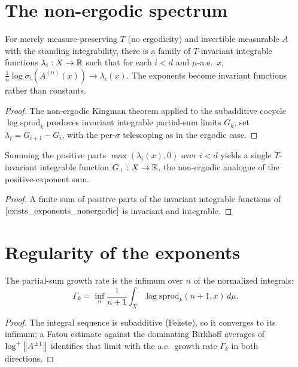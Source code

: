 \section{The non-ergodic spectrum}

\begin{theorem}\label{exists_exponents_nonergodic}
  \leanok
  For merely measure-preserving $T$ (no ergodicity) and invertible measurable $A$ with the standing integrability, there is a family of $T$-invariant integrable functions $\lambda_i : X \to \mathbb{R}$ such that for each $i < d$ and $\mu$-a.e.\ $x$, $\tfrac1n\log\sigma_i(A^{(n)}(x)) \to \lambda_i(x)$. The exponents become invariant functions rather than constants.
\end{theorem}
\begin{proof}\leanok
  The non-ergodic Kingman theorem applied to the subadditive cocycle $\log\mathrm{sprod}_k$ produces invariant integrable partial-sum limits $G_k$; set $\lambda_i = G_{i+1} - G_i$, with the per-$\sigma$ telescoping as in the ergodic case.
\end{proof}

\begin{corollary}\label{exists_sumPosExp_nonergodic}
  \leanok
  Summing the positive parts $\max(\lambda_i(x),0)$ over $i < d$ yields a single $T$-invariant integrable function $G_+ : X \to \mathbb{R}$, the non-ergodic analogue of the positive-exponent sum.
\end{corollary}
\begin{proof}\leanok
  A finite sum of positive parts of the invariant integrable functions of $\ref{exists_exponents_nonergodic}$ is invariant and integrable.
\end{proof}

\section{Regularity of the exponents}

\begin{theorem}\label{gammaK_eq_iInf}
  \leanok
  The partial-sum growth rate is the infimum over $n$ of the normalized integrals:
  \[ \Gamma_k = \inf_n \frac{1}{n+1}\int_X \log\mathrm{sprod}_k(n+1,x)\,d\mu. \]
\end{theorem}
\begin{proof}\leanok
  The integral sequence is subadditive (Fekete), so it converges to its infimum; a Fatou estimate against the dominating Birkhoff averages of $\log^+\left\lVert A^{\pm1} \right\rVert$ identifies that limit with the a.e.\ growth rate $\Gamma_k$ in both directions.
\end{proof}

